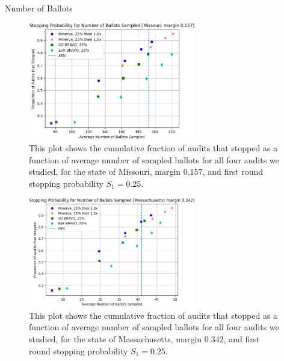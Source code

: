 \documentclass[final]{beamer}
\newlength{\colwidth}
\begin{document}
\begin{frame}[t]
\begin{columns}[t]
\begin{column}{\colwidth}
\begin{block}{Number of Ballots}
\begin{figure}
\begin{centering}
\includegraphics[width=0.65\textwidth]{missouri25.png}
\caption{This plot shows the cumulative fraction of audits that stopped as a function of average number of sampled ballots for all four audits we studied, for the state of Missouri, margin $0.157$, and first round stopping probability $S_1=0.25$.}
\label{fig:missouri_25}
\end{centering}
\end{figure}

\begin{figure}
\begin{centering}
\includegraphics[width=0.65\textwidth]{massachusetts25.png}
\caption{This plot shows the cumulative fraction of audits that stopped as a function of average number of sampled ballots for all four audits we studied, for the state of Massachusetts, margin $0.342$, and first round stopping probability $S_1=0.25$.}
\label{fig:mass_25}
\end{centering}
\end{figure}


\end{block}
\end{column}
\end{columns}
\end{frame}
\end{document}
